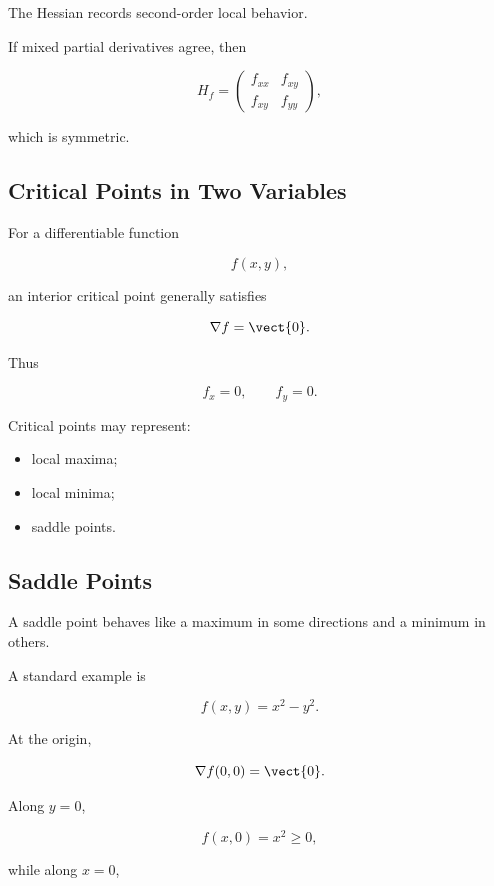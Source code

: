The Hessian records second-order local behavior.

If mixed partial derivatives agree, then

\[ H_f=
\begin{pmatrix}
f_{xx} & f_{xy}\\
f_{xy} & f_{yy}
\end{pmatrix}, \]

which is symmetric.

\subsection{Critical Points in Two Variables}
\label{subsec:critical-points-two-variables}

For a differentiable function

\[ f(x,y), \]

an interior critical point generally satisfies

\[ \nabla f=\vect{0}. \]

Thus

\[ f_x=0,\qquad f_y=0. \]

Critical points may represent:

\begin{itemize}
    \item local maxima;
    \item local minima;
    \item saddle points.
\end{itemize}

\subsection{Saddle Points}
\label{subsec:saddle-points}

A saddle point behaves like a maximum in some directions and a minimum in
others.

A standard example is

\[ f(x,y)=x^2-y^2. \]

At the origin,

\[ \nabla f(0,0)=\vect{0}. \]

Along \(y=0\),

\[ f(x,0)=x^2\geq0, \]

while along \(x=0\),

